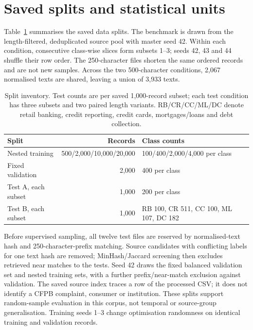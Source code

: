 \documentclass[11pt]{article}
\begin{document}
\section{Saved splits and statistical units}
\label{sec:split_integrity}

Table~\ref{tab:split_inventory} summarises the saved data splits.
The benchmark is drawn from the length-filtered, deduplicated source
pool with master seed 42. Within each condition, consecutive class-wise
slices form subsets 1--3; seeds 42, 43 and 44 shuffle their row order.
The 250-character files shorten the same ordered records and are not
new samples. Across the two 500-character conditions, 2,067 normalised
texts are shared, leaving a union of 3,933 texts.

\begin{table}[htbp]\centering\small
\caption{Split inventory. Test counts are per saved 1,000-record subset;
each test condition has three subsets and two paired length variants.
RB/CR/CC/ML/DC denote retail banking, credit reporting, credit cards,
mortgages/loans and debt collection.}
\label{tab:split_inventory}
\begin{tabular}{lrl}\toprule
Split & Records & Class counts \\\midrule
Nested training & 500/2,000/10,000/20,000 & 100/400/2,000/4,000 per class \\
Fixed validation & 2,000 & 400 per class \\
Test A, each subset & 1,000 & 200 per class \\
Test B, each subset & 1,000 & RB 100, CR 511, CC 100, ML 107, DC 182 \\
\bottomrule\end{tabular}
\end{table}

Before supervised sampling, all twelve test files are reserved by
normalised-text hash and 250-character-prefix matching. Source candidates
with conflicting labels for one text hash are removed; MinHash/Jaccard
screening then excludes retrieved near matches to the tests.
Seed 42 draws the fixed balanced validation set and nested training
sets, with a further prefix/near-match exclusion against validation.
The saved source index traces a row of the processed CSV; it does not
identify a CFPB complaint, consumer or institution. These splits support
random-sample evaluation in this corpus, not temporal or source-group
generalisation. Training seeds 1--3 change optimisation randomness on
identical training and validation records.
\end{document}
